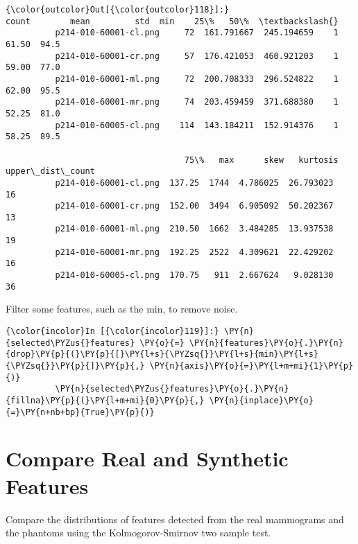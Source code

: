             \begin{Verbatim}[commandchars=\\\{\}]
{\color{outcolor}Out[{\color{outcolor}118}]:}                        count        mean         std  min    25\%   50\%  \textbackslash{}
          p214-010-60001-cl.png     72  161.791667  245.194659    1  61.50  94.5
          p214-010-60001-cr.png     57  176.421053  460.921203    1  59.00  77.0
          p214-010-60001-ml.png     72  200.708333  296.524822    1  62.00  95.5
          p214-010-60001-mr.png     74  203.459459  371.688380    1  52.25  81.0
          p214-010-60005-cl.png    114  143.184211  152.914376    1  58.25  89.5

                                    75\%   max      skew   kurtosis  upper\_dist\_count
          p214-010-60001-cl.png  137.25  1744  4.786025  26.793023                16
          p214-010-60001-cr.png  152.00  3494  6.905092  50.202367                13
          p214-010-60001-ml.png  210.50  1662  3.484285  13.937538                19
          p214-010-60001-mr.png  192.25  2522  4.309621  22.429202                16
          p214-010-60005-cl.png  170.75   911  2.667624   9.028130                36
\end{Verbatim}

    Filter some features, such as the min, to remove noise.

    \begin{Verbatim}[commandchars=\\\{\}]
{\color{incolor}In [{\color{incolor}119}]:} \PY{n}{selected\PYZus{}features} \PY{o}{=} \PY{n}{features}\PY{o}{.}\PY{n}{drop}\PY{p}{(}\PY{p}{[}\PY{l+s}{\PYZsq{}}\PY{l+s}{min}\PY{l+s}{\PYZsq{}}\PY{p}{]}\PY{p}{,} \PY{n}{axis}\PY{o}{=}\PY{l+m+mi}{1}\PY{p}{)}
          \PY{n}{selected\PYZus{}features}\PY{o}{.}\PY{n}{fillna}\PY{p}{(}\PY{l+m+mi}{0}\PY{p}{,} \PY{n}{inplace}\PY{o}{=}\PY{n+nb+bp}{True}\PY{p}{)}
\end{Verbatim}

    \section{Compare Real and Synthetic
Features}\label{compare-real-and-synthetic-features}

    Compare the distributions of features detected from the real mammograms
and the phantoms using the Kolmogorov-Smirnov two sample test.

